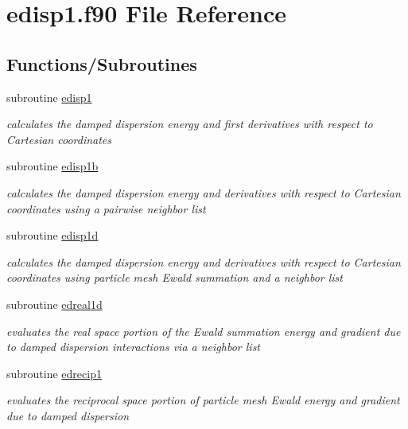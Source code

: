 \hypertarget{edisp1_8f90}{\section{edisp1.\-f90 File Reference}
\label{edisp1_8f90}
}
\subsection*{Functions/\-Subroutines}
\begin{DoxyCompactItemize}
\item 
subroutine \hyperlink{edisp1_8f90_a362bfb76e819dd66099097d589cffd63}{edisp1}
\begin{DoxyCompactList}\small\item\em calculates the damped dispersion energy and first derivatives with respect to Cartesian coordinates \end{DoxyCompactList}\item 
subroutine \hyperlink{edisp1_8f90_a11a15d00e54ed80d9c94ceed28e4e6d1}{edisp1b}
\begin{DoxyCompactList}\small\item\em calculates the damped dispersion energy and derivatives with respect to Cartesian coordinates using a pairwise neighbor list \end{DoxyCompactList}\item 
subroutine \hyperlink{edisp1_8f90_a21f09fb15e0b1bcee5dbaf7271192c84}{edisp1d}
\begin{DoxyCompactList}\small\item\em calculates the damped dispersion energy and derivatives with respect to Cartesian coordinates using particle mesh Ewald summation and a neighbor list \end{DoxyCompactList}\item 
subroutine \hyperlink{edisp1_8f90_a75ddebb0567efea1d05ef437cc0ac8cf}{edreal1d}
\begin{DoxyCompactList}\small\item\em evaluates the real space portion of the Ewald summation energy and gradient due to damped dispersion interactions via a neighbor list \end{DoxyCompactList}\item 
subroutine \hyperlink{edisp1_8f90_af1b7c7f1e402b913402fe9519f1a2548}{edrecip1}
\begin{DoxyCompactList}\small\item\em evaluates the reciprocal space portion of particle mesh Ewald energy and gradient due to damped dispersion \end{DoxyCompactList}\end{DoxyCompactItemize}


